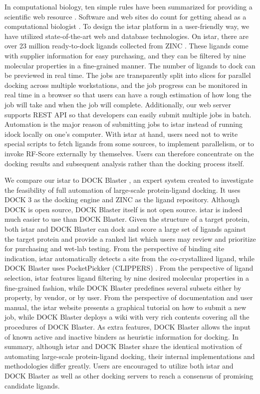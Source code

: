 In computational biology, ten simple rules have been summarized for providing a scientific web resource \citep{677}. Software and web sites do count for getting ahead as a computational biologist \citep{260}. To design the istar platform in a user-friendly way, we have utilized state-of-the-art web and database technologies. On istar, there are over 23 million ready-to-dock ligands collected from ZINC \citep{532,1178}. These ligands come with supplier information for easy purchasing, and they can be filtered by nine molecular properties in a fine-grained manner. The number of ligands to dock can be previewed in real time. The jobs are transparently split into slices for parallel docking across multiple workstations, and the job progress can be monitored in real time in a browser so that users can have a rough estimation of how long the job will take and when the job will complete. Additionally, our web server supports REST API so that developers can easily submit multiple jobs in batch. Automation is the major reason of submitting jobs to istar instead of running idock locally on one's computer. With istar at hand, users need not to write special scripts to fetch ligands from some sources, to implement parallelism, or to invoke RF-Score externally by themselves. Users can therefore concentrate on the docking results and subsequent analysis rather than the docking process itself.

We compare our istar to DOCK Blaster \citep{557}, an expert system created to investigate the feasibility of full automation of large-scale protein-ligand docking. It uses DOCK 3 \citep{1445} as the docking engine and ZINC \citep{532,1178} as the ligand repository. Although DOCK is open source, DOCK Blaster itself is not open source. istar is indeed much easier to use than DOCK Blaster. Given the structure of a target protein, both istar and DOCK Blaster can dock and score a large set of ligands against the target protein and provide a ranked list which users may review and prioritize for purchasing and wet-lab testing. From the perspective of binding site indication, istar automatically detects a site from the co-crystallized ligand, while DOCK Blaster uses PocketPickker (CLIPPERS) \citep{395}. From the perspective of ligand selection, istar features ligand filtering by nine desired molecular properties in a fine-grained fashion, while DOCK Blaster predefines several subsets either by property, by vendor, or by user. From the perspective of documentation and user manual, the istar website presents a graphical tutorial on how to submit a new job, while DOCK Blaster deploys a wiki with very rich contents covering all the procedures of DOCK Blaster. As extra features, DOCK Blaster allows the input of known active and inactive binders as heuristic information for docking. In summary, although istar and DOCK Blaster share the identical motivation of automating large-scale protein-ligand docking, their internal implementations and methodologies differ greatly. Users are encouraged to utilize both istar and DOCK Blaster as well as other docking servers to reach a consensus of promising candidate ligands.

